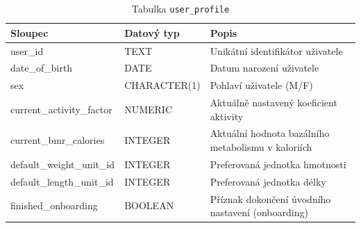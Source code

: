 \begin{table}[ht!]
    \centering
    \begin{tabularx}{\textwidth}{|l|l|L|}
        \hline
        \textbf{Sloupec}          & \textbf{Datový typ} & \textbf{Popis}                                     \\ \hline
        user\_id                  & TEXT                & Unikátní identifikátor uživatele                   \\ \hline
        date\_of\_birth           & DATE                & Datum narození uživatele                           \\ \hline
        sex                       & CHARACTER(1)        & Pohlaví uživatele (M/F)                            \\ \hline
        current\_activity\_factor & NUMERIC             & Aktuálně nastavený koeficient aktivity             \\ \hline
        current\_bmr\_calories    & INTEGER             & Aktuální hodnota bazálního metabolismu v kaloriích \\ \hline
        default\_weight\_unit\_id & INTEGER             & Preferovaná jednotka hmotnosti                     \\ \hline
        default\_length\_unit\_id & INTEGER             & Preferovaná jednotka délky                         \\ \hline
        finished\_onboarding      & BOOLEAN             & Příznak dokončení úvodního nastavení (onboarding)  \\ \hline
    \end{tabularx}
    \caption{Tabulka \texttt{user\_profile}}
    \label{tab:user_profile}
\end{table}
